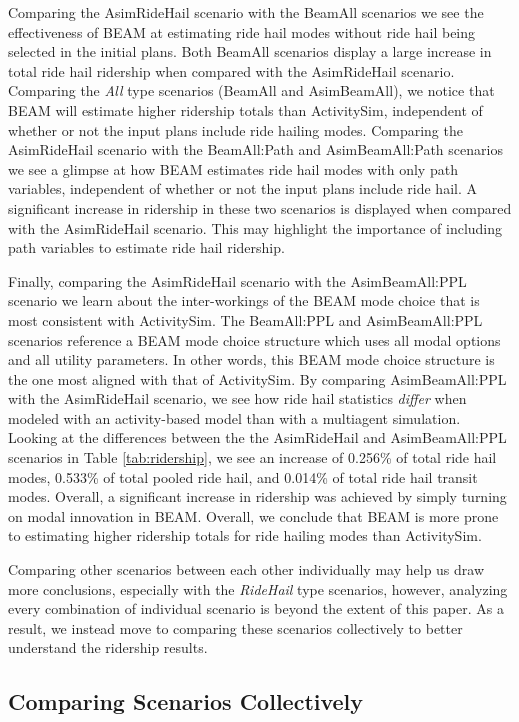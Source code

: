 \documentclass[12pt, oneside, openright]{byuthesis}
\begin{document}
Comparing the AsimRideHail scenario with the BeamAll scenarios we see the effectiveness of BEAM at estimating ride hail modes without ride hail being selected in the initial plans. Both BeamAll scenarios display a large increase in total ride hail ridership when compared with the AsimRideHail scenario. Comparing the \emph{All} type scenarios (BeamAll and AsimBeamAll), we notice that BEAM will estimate higher ridership totals than ActivitySim, independent of whether or not the input plans include ride hailing modes. Comparing the AsimRideHail scenario with the BeamAll:Path and AsimBeamAll:Path scenarios we see a glimpse at how BEAM estimates ride hail modes with only path variables, independent of whether or not the input plans include ride hail. A significant increase in ridership in these two scenarios is displayed when compared with the AsimRideHail scenario. This may highlight the importance of including path variables to estimate ride hail ridership.

Finally, comparing the AsimRideHail scenario with the AsimBeamAll:PPL scenario we learn about the inter-workings of the BEAM mode choice that is most consistent with ActivitySim. The BeamAll:PPL and AsimBeamAll:PPL scenarios reference a BEAM mode choice structure which uses all modal options and all utility parameters. In other words, this BEAM mode choice structure is the one most aligned with that of ActivitySim. By comparing AsimBeamAll:PPL with the AsimRideHail scenario, we see how ride hail statistics \emph{differ} when modeled with an activity-based model than with a multiagent simulation. Looking at the differences between the the AsimRideHail and AsimBeamAll:PPL scenarios in Table \ref{tab:ridership}, we see an increase of 0.256\% of total ride hail modes, 0.533\% of total pooled ride hail, and 0.014\% of total ride hail transit modes. Overall, a significant increase in ridership was achieved by simply turning on modal innovation in BEAM. Overall, we conclude that BEAM is more prone to estimating higher ridership totals for ride hailing modes than ActivitySim.

Comparing other scenarios between each other individually may help us draw more conclusions, especially with the \emph{RideHail} type scenarios, however, analyzing every combination of individual scenario is beyond the extent of this paper. As a result, we instead move to comparing these scenarios collectively to better understand the ridership results.

\hypertarget{res-col}{%
\subsection{Comparing Scenarios Collectively}\label{res-col}}
\end{document}

